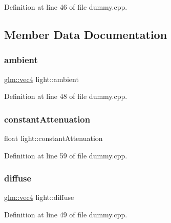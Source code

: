 Definition at line 46 of file dummy.\+cpp.



\subsection{Member Data Documentation}
\mbox{\label{structlight_a55272e98f6354987f671e462020a114f}} 
\subsubsection{\texorpdfstring{ambient}{ambient}}
{\footnotesize\ttfamily \hyperlink{group__core__types_ga5881b1b022d7fd1b7218f5916532dd02}{glm\+::vec4} light\+::ambient}



Definition at line 48 of file dummy.\+cpp.

\mbox{\label{structlight_a788e3a9fbc05cd748dd6a181b6043892}} 
\subsubsection{\texorpdfstring{constant\+Attenuation}{constantAttenuation}}
{\footnotesize\ttfamily float light\+::constant\+Attenuation}



Definition at line 59 of file dummy.\+cpp.

\mbox{\label{structlight_a3c5ae9ee6f2d72bd13b0f11f7dbc8802}} 
\subsubsection{\texorpdfstring{diffuse}{diffuse}}
{\footnotesize\ttfamily \hyperlink{group__core__types_ga5881b1b022d7fd1b7218f5916532dd02}{glm\+::vec4} light\+::diffuse}



Definition at line 49 of file dummy.\+cpp.

\mbox{\label{structlight_af8848393784e35f096bea1a663ba1a9c}} 
